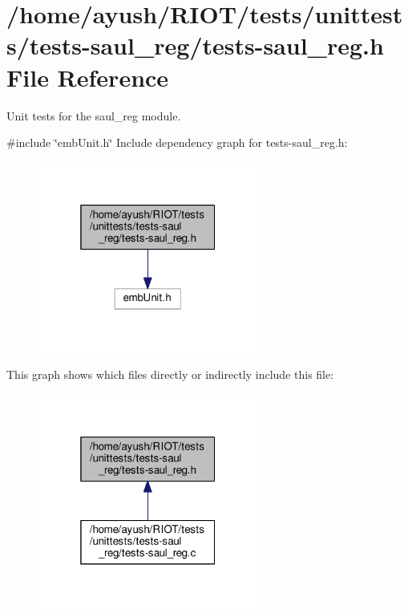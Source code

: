 \hypertarget{tests-saul__reg_8h}{}\section{/home/ayush/\+R\+I\+O\+T/tests/unittests/tests-\/saul\+\_\+reg/tests-\/saul\+\_\+reg.h File Reference}
\label{tests-saul__reg_8h}


Unit tests for the {\ttfamily saul\+\_\+reg} module.  


{\ttfamily \#include \char`\"{}emb\+Unit.\+h\char`\"{}}\newline
Include dependency graph for tests-\/saul\+\_\+reg.h\+:
\nopagebreak
\begin{figure}[H]
\begin{center}
\leavevmode
\includegraphics[width=205pt]{tests-saul__reg_8h__incl}
\end{center}
\end{figure}
This graph shows which files directly or indirectly include this file\+:
\nopagebreak
\begin{figure}[H]
\begin{center}
\leavevmode
\includegraphics[width=205pt]{tests-saul__reg_8h__dep__incl}
\end{center}
\end{figure}
